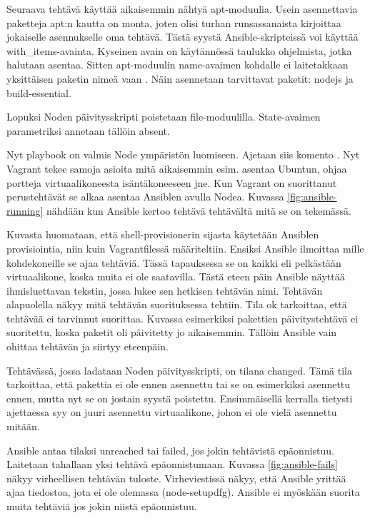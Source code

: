 Seuraava tehtävä käyttää aikaisemmin nähtyä apt-moduulia. Usein asennettavia paketteja apt:n kautta on monta, joten olisi turhan runsassanaista kirjoittaa jokaiselle asennukselle oma tehtävä. Tästä syystä Ansible-skripteissä voi käyttää with\_items-avainta. Kyseinen avain on käytännössä taulukko ohjelmista, jotka halutaan asentaa. Sitten apt-moduulin name-avaimen kohdalle ei laitetakkaan yksittäisen paketin nimeä vaan . Näin asennetaan tarvittavat paketit: nodejs ja build-essential.

Lopuksi Noden päivitysskripti poistetaan file-moduulilla. State-avaimen parametriksi annetaan tällöin absent.

Nyt playbook on valmis Node ympäristön luomiseen. Ajetaan siis komento . Nyt Vagrant tekee samoja asioita mitä aikaisemmin esim. asentaa Ubuntun, ohjaa portteja virtuaalikoneesta isäntäkoneeseen jne. Kun Vagrant on suorittanut perustehtävät se alkaa asentaa Ansiblen avulla Nodea. Kuvassa \ref{fig:ansible-running} nähdään kun Ansible kertoo tehtävä tehtävältä mitä se on tekemässä.

Kuvasta huomataan, että shell-provisionerin sijasta käytetään Ansiblen provisiointia, niin kuin Vagrantfilessä määriteltiin. Ensiksi Ansible ilmoittaa mille kohdekoneille se ajaa tehtäviä. Tässä tapauksessa se on kaikki eli pelkästään virtuaalikone, koska muita ei ole saatavilla. Tästä eteen päin Ansible näyttää ihmisluettavan tekstin, jossa lukee sen hetkisen tehtävän nimi. Tehtävän alapuolella näkyy mitä tehtävän suorituksessa tehtiin. Tila ok tarkoittaa, että tehtävää ei tarvinnut suorittaa. Kuvassa esimerkiksi pakettien päivitystehtävä ei suoritettu, koska paketit oli päivitetty jo aikaisemmin. Tällöin Ansible vain ohittaa tehtävän ja siirtyy eteenpäin.

Tehtävässä, jossa ladataan Noden päivitysskripti, on tilana changed. Tämä tila tarkoittaa, että pakettia ei ole ennen asennettu tai se on esimerkiksi asennettu ennen, mutta nyt se on jostain syystä poistettu. Ensimmäisellä kerralla tietysti ajettaessa syy on juuri asennettu virtuaalikone, johon ei ole vielä asennettu mitään.

Ansible antaa tilaksi unreached tai failed, jos jokin tehtävistä epäonnistuu. Laitetaan tahallaan yksi tehtävä epäonnistumaan. Kuvassa \ref{fig:ansible-fails} näkyy virheellisen tehtävän tuloste. Virheviestissä näkyy, että Ansible yrittää ajaa tiedostoa, jota ei ole olemassa (node-setupdfg). Ansible ei myöskään suorita muita tehtäviä jos jokin niistä epäonnistuu.

